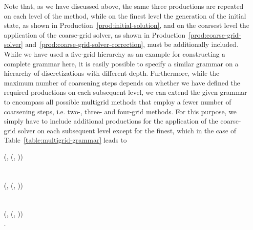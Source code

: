 Note that, as we have discussed above, the same three productions are repeated on each level of the method, while on the finest level the generation of the initial state, as shown in Production~\eqref{prod:initial-solution}, and on the coarsest level the application of the coarse-grid solver, as shown in Production~\eqref{prod:coarse-grid-solver} and~\eqref{prod:coarse-grid-solver-correction}, must be additionally included.
While we have used a five-grid hierarchy as an example for constructing a complete grammar here, it is easily possible to specify a similar grammar on a hierarchy of discretizations with different depth.
Furthermore, while the maximum number of coarsening steps depends on whether we have defined the required productions on each subsequent level, we can extend the given grammar to encompass all possible multigrid methods that employ a fewer number of coarsening steps, i.e. two-, three- and four-grid methods.
For this purpose, we simply have to include additional productions for the application of the coarse-grid solver on each subsequent level except for the finest, which in the case of Table~\ref{table:multigrid-grammar} leads to
\begin{bnf*}
	 {
		(, \bnfsp {}(, \bnfsp{}))
	} \\
	 \\ \\
	 {
		(, \bnfsp {}(, \bnfsp{}))
	} \\
	 \\ \\
	 {
		(, \bnfsp {}(, \bnfsp{}))
	} \\
	.
\end{bnf*}
\setcounter{equation}{118}

